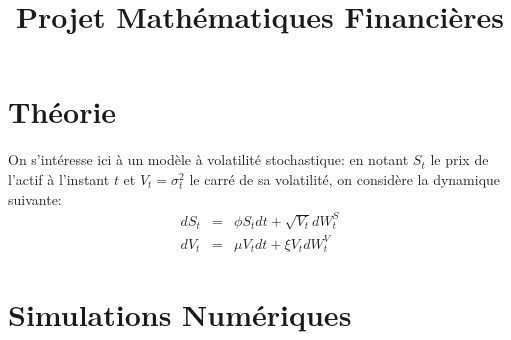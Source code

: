 \documentclass{report}
\title{Projet Mathématiques Financières}
\begin{document}
\section*{Théorie}
On s'intéresse ici à un modèle à volatilité stochastique: en notant $S_t$ le prix de l'actif à l'instant $t$ et $V_t = \sigma_t^2$ le carré de sa volatilité, on considère la dynamique suivante:
\begin{eqnarray*}
dS_t &=& \phi S_t dt + \sqrt{V_t}dW_t^S\\
dV_t &=& \mu V_t dt + \xi V_t dW_t^V
\end{eqnarray*}

\section*{Simulations Numériques}
\end{document}
